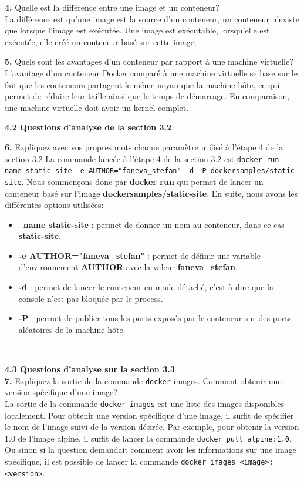 \documentclass[12pt, letterpaper]{report}
\begin{document}
\textbf{4.} Quelle est la différence entre une image et un conteneur? \\
La différence est qu'une image est la source d'un conteneur, un conteneur n'existe que lorsque l'image est exécutée. Une image est exécutable, lorsqu'elle est exécutée, elle créé un conteneur basé sur cette image. 
\newline

\textbf{5.} Quels sont les avantages d'un conteneur par rapport à une machine virtuelle? \\
L'avantage d'un conteneur Docker comparé à une machine virtuelle se base sur le fait que les conteneurs partagent le même noyau que la machine hôte, ce qui permet de réduire leur taille ainsi que le temps de démarrage. En comparaison, une machine virtuelle doit avoir un kernel complet. 
\newline

\textbf{4.2 Questions d'analyse de la section 3.2}

\textbf{6.} Expliquez avec vos propres mots chaque paramètre utilisé à l'étape 4 de la section 3.2
La commande lancée à l'étape 4 de la section 3.2 est \texttt{docker run --name static-site -e AUTHOR="faneva_stefan" -d -P dockersamples/static-site}.
Nous commençons donc par \textbf{docker run} qui permet de lancer un conteneur basé sur l'image \textbf{dockersamples/static-site}. En suite, nous avons les différentes 
options utilisées:
\begin{itemize}
	\item \textbf{--name static-site} : permet de donner un nom au conteneur, dans ce cas \textbf{static-site}.
	\item \textbf{-e AUTHOR="faneva\_stefan"} : permet de définir une variable d'environnement \textbf{AUTHOR} avec la valeur \textbf{faneva\_stefan}.
	\item \textbf{-d} : permet de lancer le conteneur en mode détaché, c'est-à-dire que la console n'est pas bloquée par le process.
	\item \textbf{-P} : permet de publier tous les ports exposés par le conteneur sur des ports aléatoires de la machine hôte.
\end{itemize}
\   \\
\newline

\textbf{4.3 Questions d'analyse sur la section 3.3}\\

\textbf{7.} Expliquez la sortie de la commande \texttt{docker} images. Comment obtenir une version spécifique d'une image?\\
La sortie de la commande \texttt{docker images} est une liste des images disponibles localement. Pour obtenir une version spécifique d'une image, il suffit de spécifier le nom de l'image suivi de la version désirée. Par exemple, pour obtenir la version 1.0 de l'image alpine, il suffit de lancer la commande \texttt{docker pull alpine:1.0}. Ou sinon si la question demandait comment avoir les informations sur une image spécifique, il est possible de lancer la commande \texttt{docker images <image>:<version>}.
\newline
\end{document}
